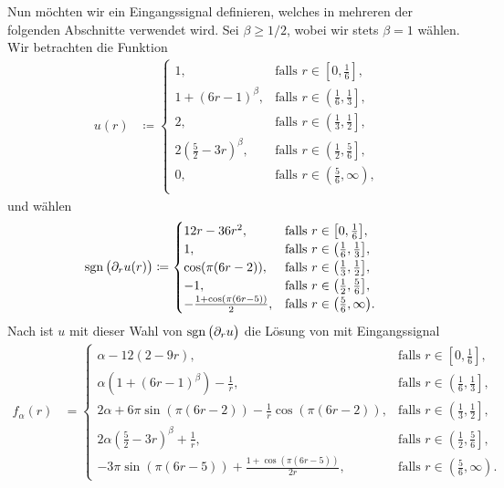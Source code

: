 Nun möchten wir ein Eingangssignal definieren, welches in mehreren der
folgenden Abschnitte verwendet wird.
Sei $\beta\geq 1/2$, wobei wir stets $\beta=1$ wählen. 
Wir betrachten die Funktion
\begin{align*}
  u(r)&\coloneqq
  \begin{cases}
    1, 
    & \text{falls } r\in \left[0,\frac{1}{6}\right]\!,\\
    1+(6r-1)^\beta, 
    & \text{falls } r\in \left(\frac{1}{6}, \frac{1}{3}\right]\!,\\
    2, 
    & \text{falls } r\in \left(\frac{1}{3}, \frac{1}{2}\right]\!,\\
    2\left(\frac{5}{2}-3r\right)^\beta, 
    & \text{falls } r\in \left(\frac{1}{2}, \frac{5}{6}\right]\!,\\
    0, 
    & \text{falls } r\in \left(\frac{5}{6}, \infty\right)\!,\\
  \end{cases}
\end{align*}
und wählen
\begin{align*}
  \operatorname{sgn}\big(\partial_r u(r)\big) 
  &\coloneqq
  \begin{cases}
    12r-36r^2, 
    & \text{falls } r\in \left[0,\frac{1}{6}\right]\!,\\
    1, 
    & \text{falls } r\in \left(\frac{1}{6}, \frac{1}{3}\right]\!,\\
    \cos(\pi(6r-2)), 
    & \text{falls } r\in \left(\frac{1}{3}, \frac{1}{2}\right]\!,\\
    -1, 
    & \text{falls } r\in \left(\frac{1}{2}, \frac{5}{6}\right]\!,\\
    -\frac{1+\cos(\pi(6r-5))}{2}, 
    & \text{falls } r\in \left(\frac{5}{6}, \infty\right)\!.
  \end{cases}
\end{align*}
Nach  ist $u$ mit dieser Wahl von
$\operatorname{sgn}\big(\partial_r u\big)$ die Lösung von  mit
Eingangssignal
\begin{align*}
  f_\alpha(r)
  &=
  \begin{cases}
    \alpha-12(2-9r), 
    & \text{falls } r\in \left[0,\frac{1}{6}\right]\!,\\
    \alpha\left(1+(6r-1)^\beta\right)-\frac{1}{r}, 
    & \text{falls } r\in \left(\frac{1}{6}, \frac{1}{3}\right]\!,\\
    2\alpha+6\pi\sin(\pi(6r-2))-\frac{1}{r}\cos(\pi(6r-2)), 
    & \text{falls } r\in \left(\frac{1}{3}, \frac{1}{2}\right]\!,\\
    2\alpha\left(\frac{5}{2}-3r\right)^\beta+\frac{1}{r},
    & \text{falls } r\in \left(\frac{1}{2}, \frac{5}{6}\right]\!,\\
    -3\pi\sin(\pi(6r-5))+\frac{1+\cos(\pi(6r-5))}{2r}, 
    & \text{falls } r\in \left(\frac{5}{6}, \infty\right)\!.
  \end{cases}
\end{align*}

